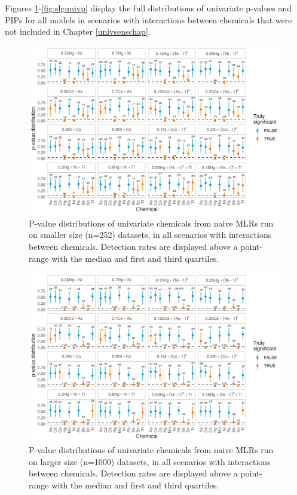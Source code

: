 \documentclass[12pt, twoside]{amherstthesis}
\begin{document}
Figures \ref{fig:nsmunivp}-\ref{fig:slgunivp} display the full distributions of univariate p-values and PIPs for all models in scenarios with interactions between chemicals that were not included in Chapter \ref{univsenschap}.
\begin{figure}

{\centering \includegraphics[width=0.8\linewidth]{figures/ch4_nsm_univ_pval} 

}

\caption{P-value distributions of univariate chemicals from naive MLRs run on smaller size (n=252) datasets, in all scenarios with interactions between chemicals. Detection rates are displayed above a point-range with the median and first and third quartiles.}\label{fig:nsmunivp}
\end{figure}
\begin{figure}

{\centering \includegraphics[width=0.8\linewidth]{figures/ch4_nlg_univ_pval} 

}

\caption{P-value distributions of univariate chemicals from naive MLRs run on larger size (n=1000) datasets, in all scenarios with interactions between chemicals. Detection rates are displayed above a point-range with the median and first and third quartiles.}\label{fig:nlgunivp}
\end{figure}
\end{document}
